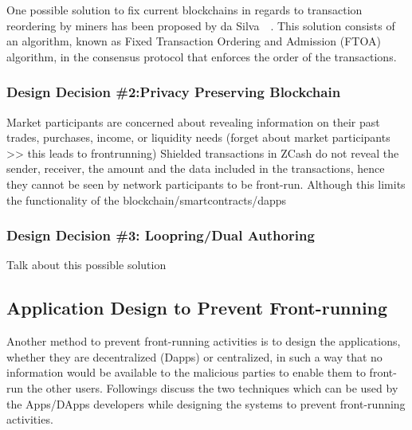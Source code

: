 One possible solution to fix current blockchains in regards to transaction reordering by miners has been proposed by da Silva~\etal~\cite{fixedordering2018silva}. This solution consists of an algorithm, known as Fixed Transaction Ordering and Admission (FTOA) algorithm, in the consensus protocol that enforces the order of the transactions. 

\subsubsection{Design Decision \#2:Privacy Preserving Blockchain\newline}

Market participants are concerned about revealing information on their past trades, purchases, income, or liquidity needs (forget about market participants >> this leads to frontrunning)
Shielded transactions in ZCash do not reveal the sender, receiver, the amount and the data included in the transactions, hence they cannot be seen by network participants to be front-run. Although this limits the functionality of the blockchain/smartcontracts/dapps 

\subsubsection{Design Decision \#3: Loopring/Dual Authoring\newline}
Talk about this possible solution



\subsection{Application Design to Prevent Front-running}

Another method to prevent front-running activities is to design the applications, whether they are decentralized (Dapps) or centralized, in such a way that no information would be available to the malicious parties to enable them to front-run the other users.
Followings discuss the two techniques which can be used by the Apps/DApps developers while designing the systems to prevent front-running activities.




